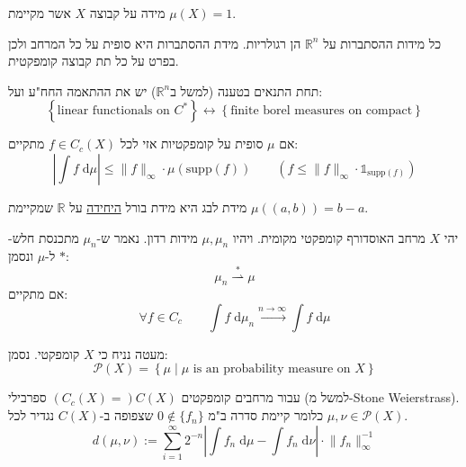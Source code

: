 \documentclass{tstextbook}
\begin{document}
\begin{definition}
מידה על קבוצה \(X\) אשר מקיימת \(\mu(X)=1\).

\end{definition}
\begin{corollary}
כל מידות ההסתברות על \(\mathbb{R}^{n}\) הן רגולריות. מידת ההסתברות היא סופית על כל המרחב ולכן בפרט על כל תת קבוצה קומפקטית.

\end{corollary}
\begin{corollary}
תחת התנאים בטענה (למשל ב\(\mathbb{R}^{n}\)) יש את ההתאמה החח"ע ועל:
$$\left\{  \text{linear functionals on } C^{*} \right\} \leftrightarrow \left\{  \text{finite borel measures on compact}  \right\}$$

\end{corollary}
\begin{remark}
אם \(\mu\) סופית על קומפקטיות אזי לכל \(f \in C_{c}(X)\) מתקיים:
$$\left\lvert  \int f \;\mathrm{d} \mu   \right\rvert \leq \lVert f \rVert _{\infty}\cdot \mu\left( \text{supp}(f) \right)\qquad \left( f\leq \lVert f \rVert _{\infty} \cdot \mathbb{1} _{\text{supp}(f)} \right)$$

\end{remark}
\begin{corollary}
מידת לבג היא מידת בורל \underline{היחידה} על \(\mathbb{R}\) שמקיימת \(\mu((a,b))=b-a\).

\end{corollary}
\begin{definition}
יהי \(X\) מרחב האוסדורף קומפקטי מקומית. ויהיו \(\mu,\mu_{n}\) מידות רדון. נאמר ש-\(\mu_{n}\) מתכנסת חלש-\(*\) ל-\(\mu\) ונסמן:
$$\mu_{n}\overset{*}{\rightharpoonup} \mu$$
אם מתקיים:
$$\forall f \in C_{c}\qquad  \int f \;\mathrm{d} \mu_{n}\xrightarrow{n\to \infty} \int f \;\mathrm{d} \mu  $$

\end{definition}
\begin{symbolize}
מעטה נניח כי \(X\) קומפקטי. נסמן:
$$\mathcal{P}(X) =\left\{  \mu \mid \mu\text{ is an probability measure on } X \right\}$$

\end{symbolize}
\begin{reminder}
עבור מרחבים קומפקטים \((C_{c}(X)=)C(X)\) ספרבילי (למשל מ-Stone Weierstrass). כלומר קיימת סדרה ב"מ \(0 \not \in\{ f_{n} \}\) שצפופה ב-\(C(X)\) נגדיר לכל \(\mu ,\nu \in \mathcal{P}(X)\).
$$d\left( \mu,\nu \right):= \sum_{i=1}^{\infty} 2^{-n}\left\lvert  \int f_{n} \;\mathrm{d} \mu -\int f_{n} \;\mathrm{d} \nu   \right\rvert \cdot \lVert f_{n} \rVert _{\infty}^{-1}$$

\end{reminder}
\end{document}
